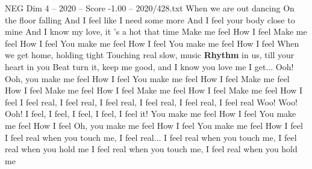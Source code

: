 \begin{textsample}{NEG Dim 4 – 2020 – Score -1.00 – 2020/428.txt}  \label{ex:f4_neg_026}
When we are out dancing On the floor falling And I feel like I need some more And I feel your body close to mine And I know my love, it 's a hot that time Make me feel How I feel Make me feel How I feel You make me feel How I feel You make me feel How I feel When we get home, holding tight Touching real slow, music \textbf{Rhythm} in us, till your heart in you Beat turn it, keep me good, and I know you love me I get...
Ooh!
Ooh, you make me feel How I feel You make me feel How I feel Make me feel How I feel Make me feel How I feel Make me feel How I feel Make me feel How I feel I feel real, I feel real, I feel real, I feel real, I feel real, I feel real Woo!
Woo!
Ooh!
I feel, I feel, I feel, I feel, I feel it!
You make me feel How I feel You make me feel How I feel Oh, you make me feel How I feel You make me feel How I feel I feel real when you touch me, I feel real...
I feel real when you touch me, I feel real when you hold me I feel real when you touch me, I feel real when you hold me

\end{textsample}
